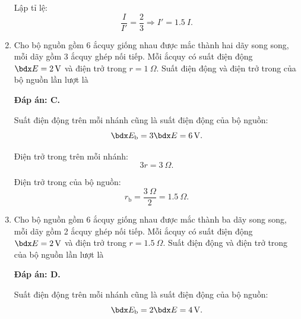 \begin{enumerate}[label=\bfseries Câu \arabic*:]
{		Lập tỉ lệ:
		$$\dfrac{I}{I'} = \dfrac{2}{3} \Rightarrow I' = \SI{1.5}{} I.$$
	}
	\item {}
	
	\cauhoi
	{Cho bộ nguồn gồm 6 ắcquy giống nhau được mắc thành hai dãy song song, mỗi dãy gồm 3 ắcquy ghép nối tiếp. Mỗi ắcquy có suất điện động $\calE = \SI{2}{V}$ và điện trở trong $r=\SI{1}{\Omega}$. Suất điện động và điện trở trong của bộ nguồn lần lượt là
		
	}
	\loigiai
	{	\textbf{Đáp án: C.}
		
		Suất điện động trên mỗi nhánh cũng là suất điện động của bộ nguồn:
		$$\calE_\text b = 3 \calE = \SI{6}{V}.$$
		
		Điện trở trong trên mỗi nhánh:
		$$3r = \SI{3}{\Omega}.$$
		
		Điện trở trong của bộ nguồn:
		$$r_\text{b} = \dfrac{\SI{3}{\Omega}}{2} = \SI{1.5}{\Omega}.$$
	}
	\item {}
	
	\cauhoi
	{Cho bộ nguồn gồm 6 ắcquy giống nhau được mắc thành ba dãy song song, mỗi dãy gồm 2 ắcquy ghép nối tiếp. Mỗi ắcquy có suất điện động $\calE = \SI{2}{V}$ và điện trở trong $r=\SI{1.5}{\Omega}$. Suất điện động và điện trở trong của bộ nguồn lần lượt là
		
	}
	\loigiai
	{	\textbf{Đáp án: D.}
		
		Suất điện động trên mỗi nhánh cũng là suất điện động của bộ nguồn:
		$$\calE_\text b = 2\calE = \SI{4}{V}.$$
		
}
\end{enumerate}
